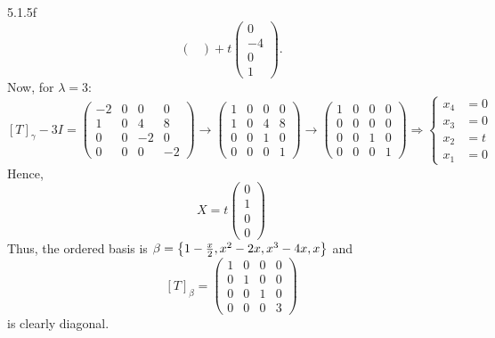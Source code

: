 \documentclass{exam}
\begin{document}
\begin{problem}{5.1.5f}
\[\begin{pmatrix}
      \end{pmatrix}
      + t\begin{pmatrix}
        0 \\ -4 \\ 0 \\ 1
      \end{pmatrix}.
    \]
    Now, for $\lambda = 3$: 
    \[
      [T]_\gamma - 3I = \begin{pmatrix}
        -2 & 0 & 0 & 0 \\
        1 & 0 & 4 & 8 \\
        0 & 0 & -2 & 0 \\
        0 & 0 & 0 & -2 
      \end{pmatrix}
      \to \begin{pmatrix}
        1 & 0 & 0 & 0 \\
        1 & 0 & 4 & 8 \\
        0 & 0 & 1 & 0 \\
        0 & 0 & 0 & 1
      \end{pmatrix}
      \to \begin{pmatrix}
        1 & 0 & 0 & 0 \\
        0 & 0 & 0 & 0 \\
        0 & 0 & 1 & 0 \\
        0 & 0 & 0 & 1
      \end{pmatrix}
      \Rightarrow \begin{cases}
        x_4 &= 0 \\
        x_3 &= 0 \\
        x_2 &= t \\
        x_1 &= 0
      \end{cases}
    \]
    Hence, 
    \[
      X = t\begin{pmatrix}
        0 \\ 1 \\ 0 \\ 0
      \end{pmatrix}
    \]
    Thus, the ordered basis is $\beta = \left\{1 - \frac{x}{2}, x^2 - 2x, x^3 - 4x, x \right\}$ and 
    \[
      [T]_\beta = \begin{pmatrix}
        1 & 0 & 0 & 0 \\
        0 & 1 & 0 & 0 \\
        0 & 0 & 1 & 0 \\
        0 & 0 & 0 & 3
      \end{pmatrix}
    \]
    is clearly diagonal.
  \end{problem}
\end{document}
